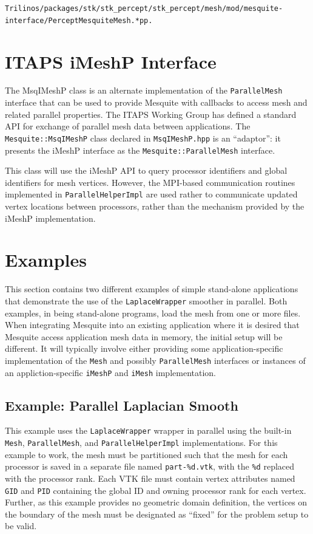 \texttt{Trilinos/packages/stk/stk\_percept/stk\_percept/mesh/mod/mesquite-interface/PerceptMesquiteMesh.*pp.}

\section{ITAPS iMeshP Interface}

The MsqIMeshP class is an alternate implementation of the \texttt{ParallelMesh} interface that can be used to provide Mesquite with callbacks to access mesh and related parallel properties.  The ITAPS Working Group has defined a standard API for exchange of parallel mesh data between applications. The \texttt{Mesquite::MsqIMeshP} class declared in \texttt{MsqIMeshP.hpp} is an ``adaptor'':  it presents the iMeshP interface as the \texttt{Mesquite::ParallelMesh} interface.  

This class will use the iMeshP API to query processor identifiers and global identifiers for mesh vertices.  However, the MPI-based communication routines implemented in \texttt{ParallelHelperImpl} are used rather to communicate updated vertex locations between processors, rather than the mechanism provided by the iMeshP implementation.

\section{Examples}

This section contains two different examples of simple stand-alone applications that demonstrate the use of the \texttt{LaplaceWrapper} smoother in parallel.  Both examples, in being stand-alone programs, load the mesh from one or more files.  When integrating Mesquite into an existing application where it is desired that Mesquite access application mesh data in memory, the initial setup will be different.  It will typically involve either providing some application-specific implementation of the \texttt{Mesh} and possibly \texttt{ParallelMesh} interfaces or instances of an appliction-specific \texttt{iMeshP} and \texttt{iMesh} implementation.

\subsection{Example: Parallel Laplacian Smooth}
\label{sec:parallel-example-1}

This example uses the \texttt{LaplaceWrapper} wrapper in parallel using the built-in \texttt{Mesh}, \texttt{ParallelMesh}, and \texttt{ParallelHelperImpl} implementations.  For this example to work, the mesh must be partitioned such that the mesh for each processor is saved in a separate file named \texttt{part-\%d.vtk}, with the \texttt{\%d} replaced with the processor rank.  Each VTK file must contain vertex attributes named \texttt{GID} and \texttt{PID} containing the global ID and owning processor rank for each vertex.  Further, as this example provides no geometric domain definition, the vertices on the boundary of the mesh must be designated as ``fixed'' for the problem setup to be valid.


